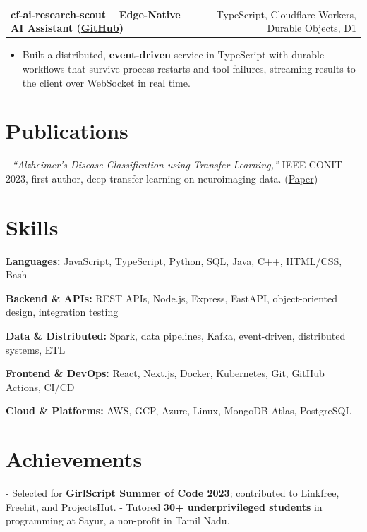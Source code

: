 \documentclass[letterpaper,11pt]{article}
\makeatletter
\newcommand{\projItem}[2]{%
  \vspace{6pt}
  \begin{tabular*}{\textwidth}{@{}l@{\extracolsep{\fill}}r@{}}
    \textbf{#1} & #2 \\
  \end{tabular*}\par\vspace{-2pt}
}
\newcommand{\skillLine}[2]{\textbf{#1:} #2\par\vspace{2pt}}
\newcommand{\inlineBlock}[1]{{\setlength{\leftskip}{0.18in}\small #1\par}}
\makeatother
\begin{document}
\projItem{cf-ai-research-scout -- Edge-Native AI Assistant {\normalfont\small(\href{https://github.com/Deva-1903/cf_ai_research_scout}{GitHub})}}{TypeScript, Cloudflare Workers, Durable Objects, D1}
\begin{itemize}
  \item Built a distributed, \textbf{event-driven} service in TypeScript with durable workflows that survive process restarts and tool failures, streaming results to the client over WebSocket in real time.
\end{itemize}

\section{Publications}
\inlineBlock{- \textit{``Alzheimer's Disease Classification using Transfer Learning,''} IEEE CONIT 2023, first author, deep transfer learning on neuroimaging data. {\normalfont\small(\href{https://ieeexplore.ieee.org/document/10205760}{Paper})}}

\section{Skills}
\skillLine{Languages}{JavaScript, TypeScript, Python, SQL, Java, C++, HTML/CSS, Bash}
\skillLine{Backend \& APIs}{REST APIs, Node.js, Express, FastAPI, object-oriented design, integration testing}
\skillLine{Data \& Distributed}{Spark, data pipelines, Kafka, event-driven, distributed systems, ETL}
\skillLine{Frontend \& DevOps}{React, Next.js, Docker, Kubernetes, Git, GitHub Actions, CI/CD}
\skillLine{Cloud \& Platforms}{AWS, GCP, Azure, Linux, MongoDB Atlas, PostgreSQL}

\section{Achievements}
\inlineBlock{- Selected for \textbf{GirlScript Summer of Code 2023}; contributed to Linkfree, Freehit, and ProjectsHut. - Tutored \textbf{30+ underprivileged students} in programming at Sayur, a non-profit in Tamil Nadu.}
\end{document}
